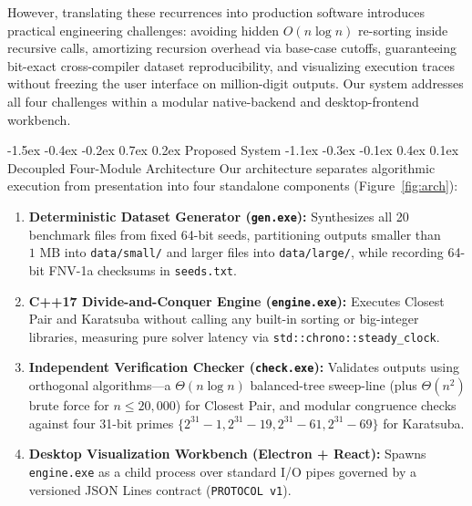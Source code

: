 \documentclass[10pt,twocolumn]{article}
\makeatletter
\renewcommand\section{\@startsection{section}{1}{\z@}%
  {-1.5ex \@plus -0.4ex \@minus -0.2ex}%
  {0.7ex \@plus 0.2ex}%
  {\normalfont\normalsize\bfseries}}
\renewcommand\subsection{\@startsection{subsection}{2}{\z@}%
  {-1.1ex \@plus -0.3ex \@minus -0.1ex}%
  {0.4ex \@plus 0.1ex}%
  {\normalfont\small\bfseries}}
\makeatother
\begin{document}
However, translating these recurrences into production software introduces practical engineering challenges: avoiding hidden $O(n \log n)$ re-sorting inside recursive calls, amortizing recursion overhead via base-case cutoffs, guaranteeing bit-exact cross-compiler dataset reproducibility, and visualizing execution traces without freezing the user interface on million-digit outputs. Our system addresses all four challenges within a modular native-backend and desktop-frontend workbench.

\section{Proposed System}
\subsection{Decoupled Four-Module Architecture}
Our architecture separates algorithmic execution from presentation into four standalone components (Figure~\ref{fig:arch}):
\begin{enumerate}
    \item \textbf{Deterministic Dataset Generator (\texttt{gen.exe}):} Synthesizes all 20 benchmark files from fixed 64-bit seeds, partitioning outputs smaller than $1\text{ MB}$ into \texttt{data/small/} and larger files into \texttt{data/large/}, while recording 64-bit FNV-1a checksums in \texttt{seeds.txt}.
    \item \textbf{C++17 Divide-and-Conquer Engine (\texttt{engine.exe}):} Executes Closest Pair and Karatsuba without calling any built-in sorting or big-integer libraries, measuring pure solver latency via \texttt{std::chrono::steady\_clock}.
    \item \textbf{Independent Verification Checker (\texttt{check.exe}):} Validates outputs using orthogonal algorithms---a $\Theta(n \log n)$ balanced-tree sweep-line (plus $\Theta(n^2)$ brute force for $n \le 20{,}000$) for Closest Pair, and modular congruence checks against four 31-bit primes $\{2^{31}-1, 2^{31}-19, 2^{31}-61, 2^{31}-69\}$ for Karatsuba.
    \item \textbf{Desktop Visualization Workbench (Electron + React):} Spawns \texttt{engine.exe} as a child process over standard I/O pipes governed by a versioned JSON Lines contract (\texttt{PROTOCOL v1}).
\end{enumerate}
\end{document}
